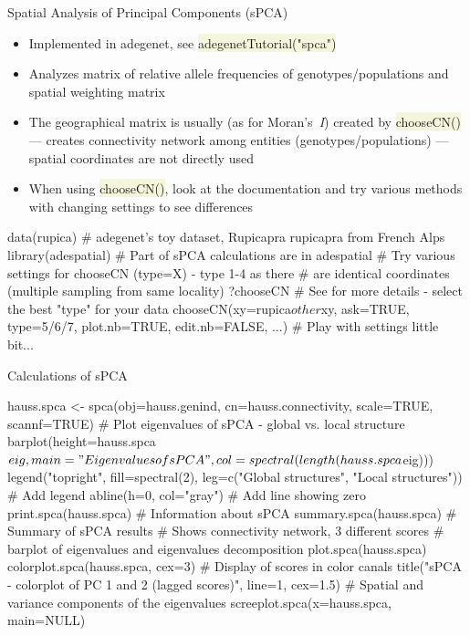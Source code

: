 \documentclass[compress, ucs, xelatex, 11pt, xcolor=svgnames, aspectratio=169,
	hyperref={
		bookmarks=true,
		unicode=true,
		colorlinks=true,
		pdftitle={Molecular data in R},
		plainpages=false,
		pdfauthor={Vojtech Zeisek},
		pdfsubject={Course about phylogeny and evolution in R},
		pdfcreator={XeLaTeX},
		pdfkeywords={R, evolution, phylogeny, molecular data},
		linkcolor=Crimson, %
		anchorcolor=Magenta, %
		citecolor=Magenta, %
		filecolor=Magenta, %
		menucolor=Magenta, %
		urlcolor=DodgerBlue, %
		pdftex},
	url={hyphens, lowtilde} %
	]{beamer}
\renewcommand{\texttt}[1]{\colorbox{Beige}{{\ttfamily #1}}}
\begin{document}
\begin{frame}[fragile]{Spatial Analysis of Principal Components (sPCA)}
	\begin{itemize}
		\item Implemented in adegenet, see \texttt{adegenetTutorial("spca")}
		\item Analyzes matrix of relative allele frequencies of genotypes/populations and spatial weighting matrix
		\item The geographical matrix is usually (as for Moran's~\textit{I}) created by \texttt{chooseCN()} --- creates connectivity network among entities (genotypes/populations) --- spatial coordinates are not directly used
		\item When using \texttt{chooseCN()}, look at the documentation and try various methods with changing settings to see differences
	\end{itemize}
	\begin{spluscode}
    data(rupica) # adegenet's toy dataset, Rupicapra rupicapra from French Alps
    library(adespatial) # Part of sPCA calculations are in adespatial
    # Try various settings for chooseCN (type=X) - type 1-4 as there
    # are identical coordinates (multiple sampling from same locality)
    ?chooseCN # See for more details - select the best "type" for your data
    chooseCN(xy=rupica$other$xy, ask=TRUE, type=5/6/7, plot.nb=TRUE,
      edit.nb=FALSE, ...) # Play with settings little bit...
	\end{spluscode}
\end{frame}

\begin{frame}[fragile]{Calculations of sPCA}
	\begin{spluscode}
    hauss.spca <- spca(obj=hauss.genind, cn=hauss.connectivity,
      scale=TRUE, scannf=TRUE)
    # Plot eigenvalues of sPCA - global vs. local structure
    barplot(height=hauss.spca$eig, main="Eigenvalues of sPCA",
      col=spectral(length(hauss.spca$eig)))
    legend("topright", fill=spectral(2), leg=c("Global structures",
      "Local structures")) # Add legend
    abline(h=0, col="gray") # Add line showing zero
    print.spca(hauss.spca) # Information about sPCA
    summary.spca(hauss.spca) # Summary of sPCA results
    # Shows connectivity network, 3 different scores
    # barplot of eigenvalues and eigenvalues decomposition
    plot.spca(hauss.spca)
    colorplot.spca(hauss.spca, cex=3) # Display of scores in color canals
    title("sPCA - colorplot of PC 1 and 2 (lagged scores)", line=1, cex=1.5)
    # Spatial and variance components of the eigenvalues
    screeplot.spca(x=hauss.spca, main=NULL)
	\end{spluscode}
\end{frame}
\end{document}
